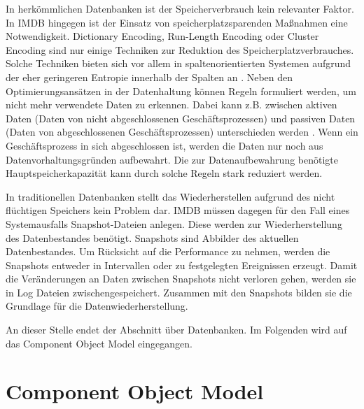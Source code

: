 In herkömmlichen Datenbanken ist der Speicherverbrauch kein relevanter Faktor. In IMDB hingegen ist der Einsatz von speicherplatzsparenden Maßnahmen eine Notwendigkeit. Dictionary Encoding, Run-Length Encoding oder Cluster Encoding sind nur einige Techniken zur Reduktion des Speicherplatzverbrauches. Solche Techniken bieten sich vor allem in spaltenorientierten Systemen aufgrund der eher geringeren Entropie innerhalb der Spalten an \cite{Abadi:2006:ICE:1142473.1142548}. Neben den Optimierungsansätzen in der Datenhaltung können Regeln formuliert werden, um nicht mehr verwendete Daten zu erkennen. Dabei kann z.B. zwischen aktiven Daten (Daten von nicht abgeschlossenen Geschäftsprozessen) und passiven Daten (Daten von abgeschlossenen Geschäftsprozessen) unterschieden werden \cite{10.1109/ICDE.2013.6544811}. Wenn ein Geschäftsprozess in sich abgeschlossen ist, werden die Daten nur noch aus Datenvorhaltungsgründen aufbewahrt. Die zur Datenaufbewahrung benötigte Hauptspeicherkapazität kann durch solche Regeln stark reduziert werden.

In traditionellen Datenbanken stellt das Wiederherstellen aufgrund des nicht flüchtigen Speichers kein Problem dar. IMDB müssen dagegen für den Fall eines Systemausfalls Snapshot-Dateien anlegen. Diese werden zur Wiederherstellung des Datenbestandes benötigt. Snapshots sind Abbilder des aktuellen Datenbestandes. Um Rücksicht auf die Performance zu nehmen, werden die Snapshots entweder in Intervallen oder zu festgelegten Ereignissen erzeugt. Damit die Veränderungen an Daten zwischen Snapshots nicht verloren gehen, werden sie in Log Dateien zwischengespeichert. Zusammen mit den Snapshots bilden sie die Grundlage für die Datenwiederherstellung. 

An dieser Stelle endet der Abschnitt über Datenbanken. Im Folgenden wird auf das Component Object Model eingegangen.

\section{Component Object Model}
\label{ch:grundlagen:sec:ComponentObjectModel}

